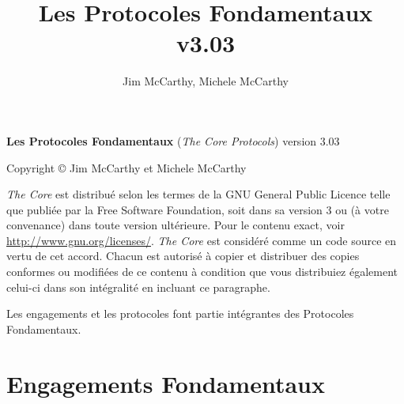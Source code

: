 \documentclass[a4paper,pagesize=pdftex,12pt]{article}
\author{Jim McCarthy, Michele McCarthy}
\title{Les Protocoles Fondamentaux v3.03}
\date{}
\begin{document}
\maketitle

\noindent \textbf{Les Protocoles Fondamentaux} (\emph{The Core Protocols}) version 3.03

\noindent Copyright \copyright{} Jim McCarthy et Michele McCarthy

\begin{small}
  \noindent \emph{The Core} est distribué selon les termes de la GNU General Public Licence telle que publiée par la Free Software
  Foundation, soit dans sa version 3 ou (à votre convenance) dans toute version ultérieure. Pour le contenu exact, voir
  \url{http://www.gnu.org/licenses/}. \emph{The Core} est considéré comme un code source en vertu de cet accord. Chacun est autorisé
  à copier et distribuer des copies conformes ou modifiées de ce contenu à condition que vous distribuiez également celui-ci
  dans son intégralité en incluant ce paragraphe.
\end{small}

Les engagements et les protocoles font partie intégrantes des Protocoles Fondamentaux.

\section{Engagements Fondamentaux}
\end{document}
